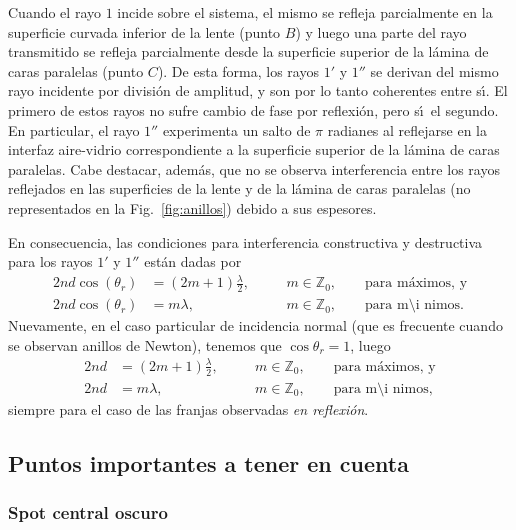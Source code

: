\documentclass[a4paper]{article}
\newcommand{\Z}{\mathbb{Z}}
\begin{document}
Cuando el rayo $1$ incide sobre el sistema, el mismo se refleja parcialmente 
en la superficie curvada inferior de la lente (punto $B$) y luego una parte del rayo 
transmitido se refleja parcialmente  desde la superficie superior de la 
l\'amina de caras paralelas (punto $C$). De esta forma, los rayos $1'$ y $1''$ se derivan
del mismo rayo incidente por divisi\'on de amplitud, y son por lo tanto 
coherentes entre s\'\i . El primero de estos rayos no sufre cambio de fase
por reflexi\'on, pero s\'\i\   el segundo. En particular, el rayo $1''$ 
experimenta un salto de $\pi$ radianes al reflejarse en la interfaz aire-vidrio
correspondiente a la superficie superior de la l\'amina de caras paralelas. 
Cabe destacar, adem\'as, que no se observa interferencia entre los rayos 
reflejados en las superficies de la lente y de la l\'amina de caras paralelas
(no representados en la Fig.~\ref{fig:anillos}) debido a sus espesores. 

En consecuencia, las condiciones para interferencia constructiva y destructiva
para los rayos $1'$ y $1''$ est\'an dadas por
\begin{align}
    2 n d \cos \left( \theta_r \right) &= \left( 2 m + 1 \right) 
    \frac{\lambda}{2}, \quad &&m \in \Z_0, \quad \quad \text{para m\'aximos, y}
    \\
    2 n d \cos \left( \theta_r \right) &= m \lambda, \quad &&m \in 
    \Z_0, \quad \quad \text{para m\'\i nimos}.
\end{align}
Nuevamente, en el caso particular de incidencia normal (que es frecuente cuando
se observan anillos de Newton), tenemos que $\cos \theta_r = 1$, luego
\begin{align}
    2 n d &= \left( 2 m + 1 \right) 
    \frac{\lambda}{2}, \quad &&m \in \Z_0, \quad \quad \text{para m\'aximos, y}
    \\
    2 n d &= m \lambda, \quad &&m \in 
    \Z_0, \quad \quad \text{para m\'\i nimos},
    \label{eq:fet}
\end{align}
siempre para el caso de las franjas observadas {\it en reflexi\'on}.

\subsection{Puntos importantes a tener en cuenta}

\subsubsection{Spot central oscuro}
\end{document}
